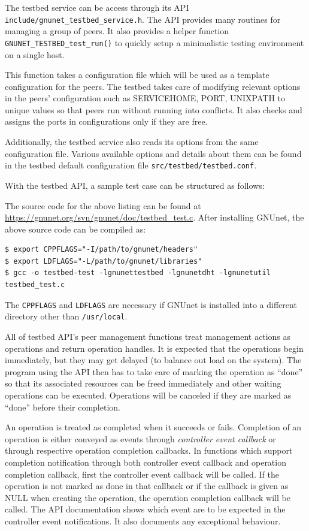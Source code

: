 \documentclass[10pt]{article}
\begin{document}
The testbed service can be access through its API
\texttt{include/gnunet\_testbed\_service.h}.  The API provides many routines for
managing a group of peers.  It also provides a helper function
\texttt{GNUNET\_TESTBED\_test\_run()} to quickly setup a minimalistic testing
environment on a single host.

This function takes a configuration file which will be used as a template
configuration for the peers.  The testbed takes care of modifying relevant
options in the peers' configuration such as SERVICEHOME, PORT, UNIXPATH to
unique values so that peers run without running into conflicts.  It also checks
and assigns the ports in configurations only if they are free.  

Additionally, the testbed service also reads its options from the same
configuration file.  Various available options and details about them can be
found in the testbed default configuration file \texttt{src/testbed/testbed.conf}.

With the testbed API, a sample test case can be structured as follows:

The source code for the above listing can be found at
\url{https://gnunet.org/svn/gnunet/doc/testbed_test.c}.  After installing GNUnet, the above source code can be compiled as:
\lstset{language=bash}
\begin{lstlisting}
$ export CPPFLAGS="-I/path/to/gnunet/headers"
$ export LDFLAGS="-L/path/to/gnunet/libraries"
$ gcc -o testbed-test -lgnunettestbed -lgnunetdht -lgnunetutil testbed_test.c
\end{lstlisting}
The \texttt{CPPFLAGS} and \texttt{LDFLAGS} are necessary if GNUnet is installed
into a different directory other than \texttt{/usr/local}.

All of testbed API's peer management functions treat management actions as
operations and return operation handles.  It is expected that the operations
begin immediately, but they may get delayed (to balance out load on the system).
The program using the API then has to take care of marking the operation as
``done'' so that its associated resources can be freed immediately and other
waiting operations can be executed.  Operations will be canceled if they are
marked as ``done'' before their completion.

An operation is treated as completed when it succeeds or fails.  Completion of
an operation is either conveyed as events through \textit{controller event
  callback} or through respective operation completion callbacks.  In functions
which support completion notification through both controller event callback and
operation completion callback, first the controller event callback will be
called.  If the operation is not marked as done in that callback or if the
callback is given as NULL when creating the operation, the operation completion
callback will be called.  The API documentation shows which event are to be
expected in the controller event notifications.  It also documents any
exceptional behaviour.
\end{document}
